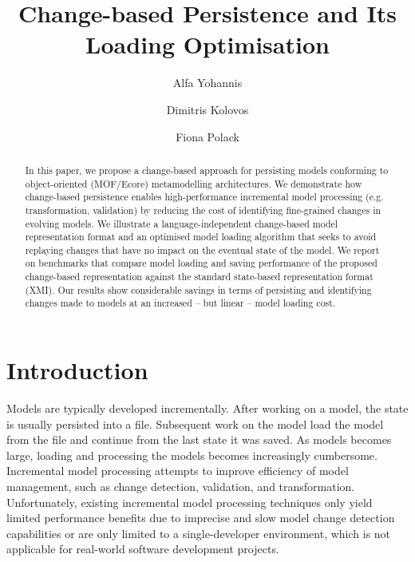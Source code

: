 \documentclass{llncs}
\begin{document}
\renewcommand{\thelstlisting}{\arabic{lstlisting}}
\renewcommand{\labelitemi}{$\bullet$}
\newcommand{\dk}[1]{\textbf{[DK: #1]}}

\title{Change-based Persistence and Its Loading Optimisation}
%
%
\author{Alfa Yohannis \and Dimitris Kolovos \and Fiona Polack }
%
%
%

\maketitle              %

\begin{abstract}
In this paper, we propose a change-based approach for persisting models conforming to object-oriented (MOF/Ecore) metamodelling architectures. We demonstrate how change-based persistence enables high-performance incremental model processing (e.g. transformation, validation) by reducing the cost of identifying fine-grained changes in evolving models. We illustrate a language-independent change-based model representation format and an optimised model loading algorithm that seeks to avoid replaying changes that have no impact on the eventual state of the model. We report on benchmarks that compare model loading and saving performance of the proposed change-based representation against the standard state-based representation format (XMI). Our results show considerable savings in terms of persisting and identifying changes made to models at an increased -- but linear -- model loading cost.
\end{abstract}

\section{Introduction}
\label{sec:introduction}
Models are typically developed incrementally. After working on a model, the state is usually persisted into a file. Subsequent work on the model load the model from the file and continue from the last state it was saved. As models becomes large, loading and processing the models becomes increasingly cumbersome. Incremental model processing attempts to improve efficiency of model management, such as change detection, validation, and transformation. Unfortunately, existing incremental model processing techniques only yield limited performance benefits due to imprecise and slow model change detection capabilities or are only limited to a single-developer environment, which is not applicable for real-world software development projects.
\end{document}
